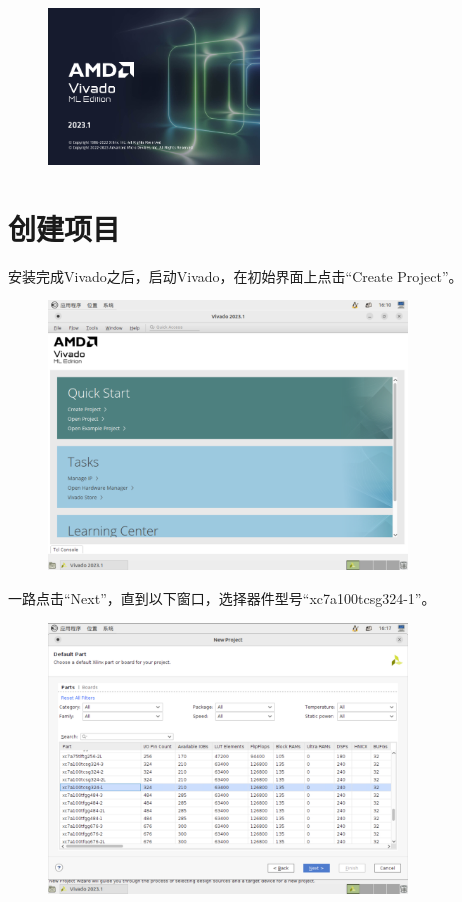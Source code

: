 \documentclass{ctexart}
\begin{document}
\begin{figure}[H]
    \centering
    \includegraphics[width=0.5\textwidth]{lab0/13.png}
\end{figure}


\section{创建项目}

安装完成Vivado之后，启动Vivado，在初始界面上点击“Create Project”。

\begin{figure}[H]
    \centering
    \includegraphics[width=0.85\textwidth]{lab0/14.png}
\end{figure}

一路点击“Next”，直到以下窗口，选择器件型号“xc7a100tcsg324-1”。

\begin{figure}[H]
    \centering
    \includegraphics[width=0.85\textwidth]{lab0/15.png}
\end{figure}
\end{document}
